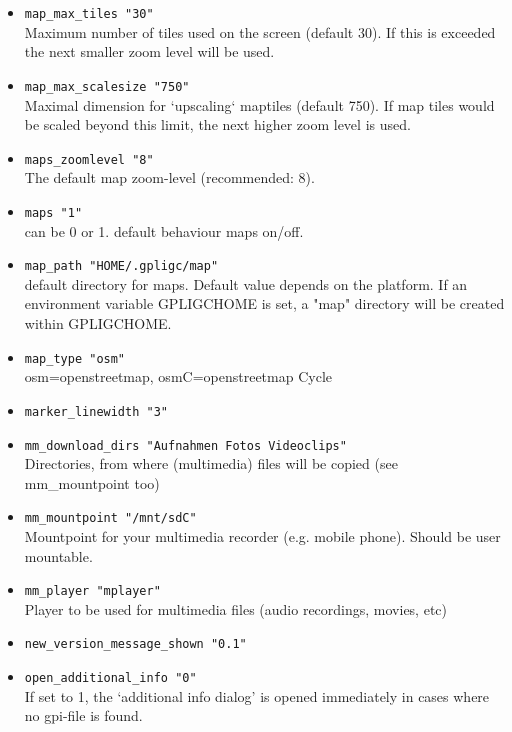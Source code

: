 \begin{itemize}
\item \texttt{map\_max\_tiles "30"}\\ Maximum number of tiles used on the screen (default 30). If this is exceeded the next smaller zoom level will be used.
\item \texttt{map\_max\_scalesize "750"}\\ Maximal dimension for `upscaling` maptiles (default 750).
If map tiles would be scaled beyond this limit, the next higher zoom level is used.
\item \texttt{maps\_zoomlevel "8"}\\ The default map zoom-level (recommended: 8).
\item \texttt{maps "1"}\\ can be 0 or 1. default behaviour maps on/off.
\item \texttt{map\_path "HOME/.gpligc/map"}\\
default directory for maps. Default value depends on the platform.
If an environment variable GPLIGCHOME is set, a "map" directory will be created within GPLIGCHOME.

\item \texttt{map\_type "osm"}\\  osm=openstreetmap, osmC=openstreetmap Cycle

\item \texttt{marker\_linewidth    "3"}
\item \texttt{mm\_download\_dirs    "Aufnahmen Fotos Videoclips"}\\
	Directories, from where (multimedia) files will be copied (see mm\_mountpoint too)
\item \texttt{mm\_mountpoint    "/mnt/sdC"} \\
	Mountpoint for your multimedia recorder (e.g. mobile phone). Should be user mountable.
\item \texttt{mm\_player    "mplayer"} \\
	Player to be used for multimedia files (audio recordings, movies, etc)

\item \texttt{new\_version\_message\_shown    "0.1"}

\item \texttt{open\_additional\_info    "0"}\\
    If set to 1, the `additional info dialog' is opened immediately in cases where no gpi-file is found.


\end{itemize}
